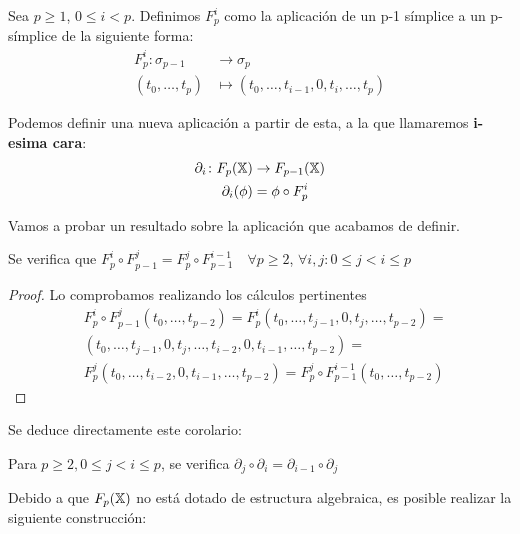 \begin{definition}
  Sea $p \geq 1$, $0 \leq i < p$. Definimos $F_p^i$ como la aplicación de un p-1 símplice a un p-símplice de la siguiente forma:
  \begin{align*}
    F_p^i \colon \sigma_{p-1} &\to \sigma_p\\
    (t_0, \dots, t_p) &\mapsto (t_0, \dots, t_{i-1}, 0, t_i, \dots, t_p)
  \end{align*}

  Podemos definir una nueva aplicación a partir de esta, a la que llamaremos \textbf{i-esima cara}:
  \begin{align*}
    \partial_i \colon F_{p}({\mathbb X}) &\to F_{p-1}({\mathbb X})\\
    \partial_i(\phi) &= \phi \circ F_p^i
  \end{align*}
\end{definition}

Vamos a probar un resultado sobre la aplicación que acabamos de definir.

\begin{lemma}
  Se verifica que $F_p^i \circ F_{p-1}^j = F_p^j \circ F_{p-1}^{i-1} \quad \forall p \geq 2$, $\forall i, j \colon 0 \leq j < i \leq p$
\end{lemma}

\begin{proof}
Lo comprobamos realizando los cálculos pertinentes
  \begin{align*}
    &F_p^i \circ F_{p-1}^j (t_0, \dots, t_{p-2}) = F_p^i (t_0, \dots, t_{j-1}, 0, t_j, \dots, t_{p-2}) = \\
    &(t_0, \dots, t_{j-1}, 0, t_j, \dots, t_{i-2}, 0, t_{i-1}, \dots, t_{p-2}) = \\
    &F_p^j (t_0, \dots, t_{i-2}, 0, t_{i-1}, \dots, t_{p-2}) = F_p^j \circ F_{p-1}^{i-1} (t_0, \dots, t_{p-2})
  \end{align*}
\end{proof}

Se deduce directamente este corolario:

\begin{corollary}
  Para $p \geq 2, 0 \leq j < i \leq p$, se verifica $\partial_j \circ \partial_i = \partial_{i-1} \circ \partial_j$
\end{corollary}

Debido a que $F_{p}({\mathbb X})$ no está dotado de estructura algebraica, es posible realizar la siguiente construcción:

